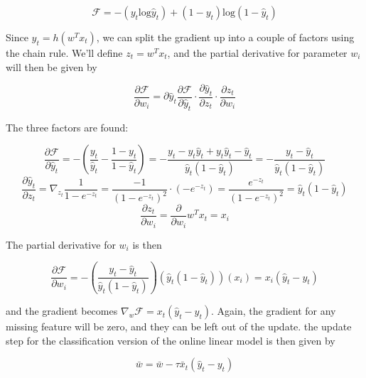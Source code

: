 \begin{equation}
  \mathcal F = -(y_t \text{log} \hat y_t) + (1-y_t) \text{log}(1 - \hat y_t) 
\end{equation}

Since $\hat y_t = h(w^T x_t)$, we can split the gradient up into a couple of
factors using the chain rule. We'll define $z_t = w^T x_t$, and the partial
derivative for parameter $w_i$ will then be given by 

\begin{equation}
  \frac{\partial \mathcal F}{\partial w_i} = {\partial \hat y_t}\frac{\partial
  \mathcal F}{\partial \hat y_t} \cdot \frac {\partial \hat y_t}{\partial z_t}
  \cdot \frac{\partial z_t}{\partial w_i}
\end{equation}

The three factors are found:

\begin{equation}
  \frac{\partial \mathcal F}{\partial \hat y_t} = -(\frac{y_t}{\hat y_t} - \frac{1-y_t}{1-\hat y_t}) = -\frac{y_t - y_t \hat y_t + y_t \hat y_t - \hat y_t}{\hat y_t (1 - \hat y_t)} = -\frac{y_t - \hat y_t}{\hat y_t (1 - \hat y_t)}
\end{equation}
\begin{equation}
  \frac{\partial \hat y_t}{\partial z_t} = \nabla_{z_t} \frac{1}{1 - e^{-z_t}} = \frac{-1}{(1 - e^{-z_t})^2} \cdot (-e^{-z_t}) = \frac{e^{-z_t}}{(1-e^{-z_t})^2} = \hat y_t (1 - \hat y_t)
\end{equation}
\begin{equation}
  \frac{\partial z_t}{\partial w_i} = \frac{\partial}{\partial w_i} w^T x_t = x_i
\end{equation}

The partial derivative for $w_i$ is then

\begin{equation}
  \frac{\partial \mathcal F}{\partial w_i} = -(\frac{y_t - \hat y_t}{\hat y_t (1 - \hat y_t)}) (\hat y_t (1 - \hat y_t)) (x_i) = x_i(\hat y_t - y_t)
\end{equation}

and the gradient becomes $\nabla_w \mathcal F = x_t (\hat y_t - y_t)$. Again,
the gradient for any missing feature will be zero, and they can be left out of
the update. the update step for the classification version of the online linear
model is then given by

\begin{equation}
  \bar w = \bar w - \tau \bar x_t (\hat y_t - y_t)
\end{equation}

